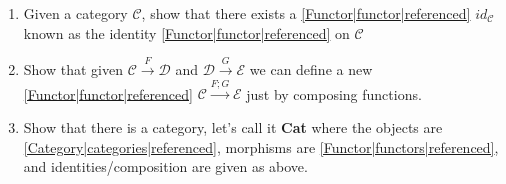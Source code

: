 
\begin{enumerate}
    \item Given a category $\mathcal{C}$, show that there exists a \ref{Functor|functor|referenced} $id_\mathcal{C}$ known as the identity \ref{Functor|functor|referenced} on $\mathcal{C}$
    \item Show that given $\mathcal{C}\xrightarrow{F}\mathcal{D}$ and $\mathcal{D}\xrightarrow{G}\mathcal{E}$ we can define a new \ref{Functor|functor|referenced} $\mathcal{C}\xrightarrow{F;G}\mathcal{E}$ just by composing functions.
    \item Show that there is a category, let's call it \textbf{Cat} where the objects are \ref{Category|categories|referenced}, morphisms are \ref{Functor|functors|referenced}, and identities/composition are given as above.

  \end{enumerate}